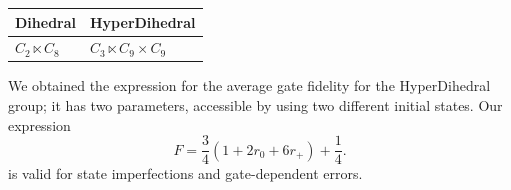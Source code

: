 \documentclass[12pt]{article}
\begin{document}
\begin{tcbposter}
{\begin{minipage}{0.45\linewidth}
\begin{center}
\begin{tabular}{l|l}
Dihedral          & HyperDihedral                 \\
\hline
$C_2 \ltimes C_8$ & $ C_3 \ltimes C_9 \times C_9$
\end{tabular}
\end{center}

\par
We obtained the expression for the average gate fidelity 
for the HyperDihedral group;
it has two parameters, accessible by using two different initial states.
Our expression 
\begin{equation*}
    \textstyle F = \frac{3}{4}(1+2r_0 + 6 r_+) + \frac{1}{4}.
\end{equation*}
is valid for state imperfections and gate-dependent errors.
\end{minipage}
}
\end{tcbposter}
\end{document}
